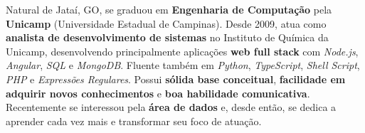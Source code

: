 

\begin{cvparagraph}

Natural de Jataí, GO, se graduou em \textbf{Engenharia de Computação} pela \textbf{Unicamp} (Universidade Estadual de Campinas). Desde 2009, atua como \textbf{analista de desenvolvimento de sistemas} no Instituto de Química da Unicamp, desenvolvendo principalmente aplicações \textbf{web full stack} com \textit{Node.js}, \textit{Angular}, \textit{SQL} e \textit{MongoDB}. Fluente também em \textit{Python}, \textit{TypeScript}, \textit{Shell Script}, \textit{PHP} e \textit{Expressões Regulares}. Possui \textbf{sólida base conceitual}, \textbf{facilidade em adquirir novos conhecimentos} e \textbf{boa habilidade comunicativa}. Recentemente se interessou pela \textbf{área de dados} e, desde então, se dedica a aprender cada vez mais e transformar seu foco de atuação.
\end{cvparagraph}
